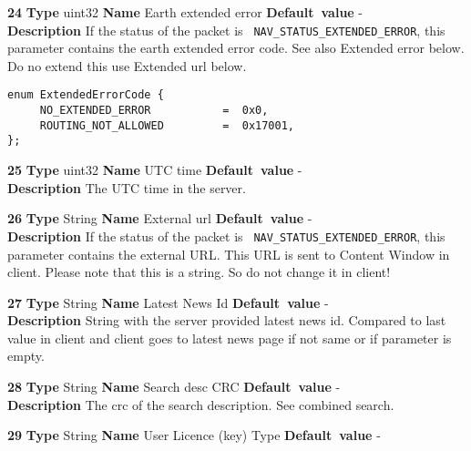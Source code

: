 \begin{list}{\textbf{ParamID}}{}
\item \textbf{24} \textbf{Type} uint32 \textbf{Name} Earth extended error
                 \textbf{Default~value} - \\
  \label{Earth Extended error}
  \textbf{Description} If the status of the packet is {\tt
    NAV\_STATUS\_EXTENDED\_ERROR}, this parameter contains the
  earth extended error code. See also Extended error below. Do no extend 
  this use Extended url below.
\begin{verbatim}
enum ExtendedErrorCode {
     NO_EXTENDED_ERROR           =  0x0,
     ROUTING_NOT_ALLOWED         =  0x17001,
};
\end{verbatim}
\item \textbf{25} \textbf{Type} uint32 \textbf{Name} UTC time
                  \textbf{Default~value} - \\
  \label{UTC time}
  \textbf{Description} The UTC time in the server.
\item \textbf{26} \textbf{Type} String \textbf{Name} External url
                 \textbf{Default~value} - \\
  \label{External url}
  \textbf{Description} If the status of the packet is {\tt
    NAV\_STATUS\_EXTENDED\_ERROR}, this parameter contains the
  external URL. This URL is sent to Content Window in client.
  Please note that this is a string. So do not change it in client!
\item \textbf{27} \textbf{Type} String \textbf{Name} Latest News Id
                 \textbf{Default~value} - \\
  \textbf{Description} String with the server provided latest news id.
                       Compared to last value in client and client
                       goes to latest news page if not same or if 
                       parameter is empty.
\item \textbf{28} \textbf{Type} String \textbf{Name} Search desc CRC
                  \textbf{Default~value} - \\
  \label{Search desc CRC}
  \textbf{Description} The crc of the search description. See combined search.
\item \textbf{29} \textbf{Type} String \textbf{Name} User Licence (key) Type
                 \textbf{Default~value} - \\

\end{list}
